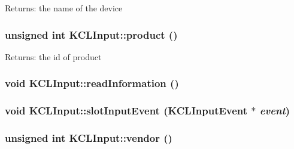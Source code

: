 \begin{Desc}
\item[Returns:]the name of the device \end{Desc}
\hypertarget{class_k_c_l_input_89c31b5c39e1f052d3408cb34861be51}{
\subsubsection[{product}]{\setlength{\rightskip}{0pt plus 5cm}unsigned int KCLInput::product ()}}
\label{class_k_c_l_input_89c31b5c39e1f052d3408cb34861be51}


\begin{Desc}
\item[Returns:]the id of product \end{Desc}
\hypertarget{class_k_c_l_input_33e1fd26c084040a728cabf03e445893}{
\subsubsection[{readInformation}]{\setlength{\rightskip}{0pt plus 5cm}void KCLInput::readInformation ()}}
\label{class_k_c_l_input_33e1fd26c084040a728cabf03e445893}


\hypertarget{class_k_c_l_input_09e6f283721d38bb9aa2a703d6a735c6}{
\subsubsection[{slotInputEvent}]{\setlength{\rightskip}{0pt plus 5cm}void KCLInput::slotInputEvent ({\bf KCLInputEvent} $\ast$ {\em event})}}
\label{class_k_c_l_input_09e6f283721d38bb9aa2a703d6a735c6}


\hypertarget{class_k_c_l_input_8b974c847387834722f09ac5725f3c68}{
\subsubsection[{vendor}]{\setlength{\rightskip}{0pt plus 5cm}unsigned int KCLInput::vendor ()}}
\label{class_k_c_l_input_8b974c847387834722f09ac5725f3c68}


